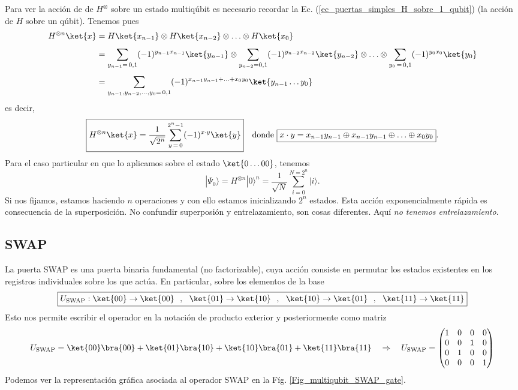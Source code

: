 \documentclass[a4paper,11pt]{book} %
\numberwithin{equation}{chapter}
\def\lp{\left(}
\def\rp{\right)}
\def\rqa{\quad \Rightarrow \quad}
\begin{document}
Para ver la acción de de $H^\otimes$ sobre un estado multiqúbit es necesario recordar la Ec. (\ref{ec_puertas_simples_H_sobre_1_qubit}) (la acción de $H$ sobre un qúbit). Tenemos pues
	\begin{align*}
	H^{\otimes n} \ket{x} & = H\ket{x_{n-1}}\otimes H\ket{x_{n-2}}\otimes \ldots \otimes H\ket{x_0} \\  \rule{0mm}{5mm} 
	& = \sum_{y_{n-1}= \, 0,1} (-1)^{y_{n-1}x_{n-1}}\ket{y_{n-1}}\otimes \sum_{y_{n-2}=0,1} (-1)^{y_{n-2}x_{n-2}}\ket{y_{n-2}} \otimes \ldots \otimes  \sum_{y_{0}\, =\, 0,1} (-1)^{y_{0}x_{0}}\ket{y_{0}} \\  \rule{0mm}{5mm} 
	& = \sum_{y_{n-1}, y_{n-2},\ldots, y_{0}=\, 0,1} (-1)^{x_{n-1} y_{n-1}+ \ldots + x_0 y_0} \ket{y_{n-1}\ldots y_0}
	\end{align*}
es decir, 
	\begin{equation} \label{ec_multiqubit_Walsh_H_sobre_x}
	\boxed{H^{\otimes n} \ket{x} = \frac{1}{\sqrt{2^n}} \sum_{y \, =\, 0}^{2^n-1}(-1)^{x\cdot y} \ket{y}} ~~ \text{ donde } \boxed{x\cdot y = x_{n-1} y_{n-1} \oplus x_{n-1} y_{n-1} \oplus \ldots \oplus x_0 y_0}.
	\end{equation} 
Para el caso particular en que lo aplicamos sobre el estado $\ket{0\ldots00}$, tenemos
	\begin{equation} \label{ec_multiqubit_Walsh_H_sobre_0}
	\boxed{|\Psi_0 \rangle = H^{\otimes n} |0 \rangle^{n} = \frac{1}{\sqrt{N}}  \sum_{i=0}^{N=2^n} | i \rangle}.
	\end{equation}
Si nos fijamos, estamos haciendo $n$ operaciones y con ello estamos inicializando $2^n$ estados. Esta acción exponencialmente rápida es consecuencia de la superposición. No confundir superposión y entrelazamiento, son cosas diferentes. Aquí \textit{no tenemos entrelazamiento}.
        
        \subsection{SWAP}

La puerta SWAP es una puerta binaria fundamental (no factorizable), cuya acción consiste en permutar los estados existentes en los registros individuales sobre los que actúa. En particular, sobre los elementos de la base
	\begin{equation}
	\boxed{U_{\rm SWAP }: \ket{00}\to\ket{00}~~,~~\ket{01}\to\ket{10}~~,~~\ket{10}\to\ket{01}~~,~~ 	\ket{11}\to\ket{11} }
	\end{equation}
Esto nos permite escribir el operador en la notación de producto exterior y posteriormente como matriz
	\begin{equation}
	U_{\rm SWAP } = \ket{00}\bra{00} + \ket{01}\bra{10} + \ket{10}\bra{01} +\ket{11}\bra{11}  \rqa	
	U_{\rm SWAP} = \lp \begin{matrix} 1 & 0 & 0 & 0 \\ 0 & 0 & 1 & 0 \\ 0 & 1 & 0 & 0 \\ 0 & 0 & 0 & 1 \end{matrix} \rp
	\end{equation}
Podemos ver la representación gráfica asociada al operador SWAP en la Fíg. \ref{Fig_multiqubit_SWAP_gate}.
\end{document}
